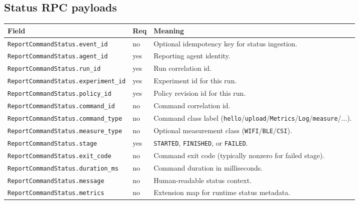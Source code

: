 \documentclass[11pt,a4paper]{article}
\begin{document}
\subsection{Status RPC payloads}
\begin{longtable}{p{4.1cm}p{1.6cm}p{9.3cm}}
\textbf{Field} & \textbf{Req} & \textbf{Meaning} \\
\hline
\endhead
\texttt{ReportCommandStatus.event\_id} & no & Optional idempotency key for status ingestion. \\
\texttt{ReportCommandStatus.agent\_id} & yes & Reporting agent identity. \\
\texttt{ReportCommandStatus.run\_id} & yes & Run correlation id. \\
\texttt{ReportCommandStatus.experiment\_id} & yes & Experiment id for this run. \\
\texttt{ReportCommandStatus.policy\_id} & yes & Policy revision id for this run. \\
\texttt{ReportCommandStatus.command\_id} & no & Command correlation id. \\
\texttt{ReportCommandStatus.command\_type} & no & Command class label (\texttt{hello}/\texttt{upload}/\texttt{Metrics}/\texttt{Log}/\texttt{measure}/...). \\
\texttt{ReportCommandStatus.measure\_type} & no & Optional measurement class (\texttt{WIFI}/\texttt{BLE}/\texttt{CSI}). \\
\texttt{ReportCommandStatus.stage} & yes & \texttt{STARTED}, \texttt{FINISHED}, or \texttt{FAILED}. \\
\texttt{ReportCommandStatus.exit\_code} & no & Command exit code (typically nonzero for failed stage). \\
\texttt{ReportCommandStatus.duration\_ms} & no & Command duration in milliseconds. \\
\texttt{ReportCommandStatus.message} & no & Human-readable status context. \\
\texttt{ReportCommandStatus.metrics} & no & Extension map for runtime status metadata. \\
\hline
\end{longtable}
\end{document}
